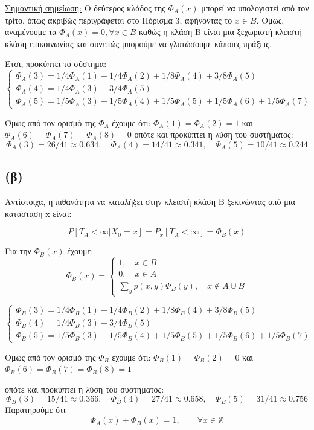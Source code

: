 \documentclass[a4paper,oneside, 11pt]{article}
\begin{document}
\underline{Σημαντική σημείωση:} Ο δεύτερος κλάδος της $\Phi_A(x)$ μπορεί να υπολογιστεί από τον τρίτο, όπως ακριβώς περιγράφεται στο Πόρισμα 3, αφήνοντας το $x \in B$. Όμως, αναμένουμε τα $\Phi_A(x) = 0, \forall x \in B$ καθώς η κλάση Β είναι μια ξεχωριστή κλειστή κλάση επικοινωνίας και συνεπώς μπορούμε να γλυτώσουμε κάποιες πράξεις. 
\bigbreak 


Έτσι, προκύπτει το σύστημα:
$$
\begin{cases}
\Phi_A(3) = 1/4 \Phi_A(1) + 1/4 \Phi_A(2) + 1/8 \Phi_A(4) + 3/8\Phi_A(5) \\
\Phi_A(4) = 1/4 \Phi_A(3) + 3/4\Phi_A(5) \\
\Phi_A(5) = 1/5\Phi_A(3) + 1/5 \Phi_A(4) + 1/5 \Phi_A(5) + 1/5\Phi_A(6) + 1/5\Phi_A(7)
\end{cases}
$$

Όμως από τον ορισμό της $\Phi_A$ έχουμε ότι: $\Phi_A(1)=\Phi_A(2) = 1$ και $\Phi_A(6)=\Phi_A(7) = \Phi_A(8) = 0$
οπότε και προκύπτει η λύση του συστήματος:
$$
\Phi_A(3) = 26/41 \approx 0.634 ,\quad \Phi_A(4)= 14/41 \approx 0.341 ,\quad \Phi_A(5) = 10/41  \approx 0.244
$$

\subsection*{(β)}
Αντίστοιχα, η πιθανότητα να καταλήξει στην κλειστή κλάση B ξεκινώντας από μια κατάσταση x είναι:

$$
P[T_A < \infty | X_0 = x] = P_x[T_A < \infty] = \Phi_Β(x)
$$

Για την $\Phi_B(x)$ έχουμε:
$$
\Phi_B(x) =  \begin{cases}
1, \quad x \in B \\
0, \quad x \in A \\
\sum_{y} p(x,y) \Phi_B(y), \quad x \not\in A \cup B
\end{cases}
$$


$$
\begin{cases}
\Phi_B(3) = 1/4 \Phi_B(1) + 1/4 \Phi_B(2) + 1/8 \Phi_B(4) + 3/8\Phi_B(5) \\
\Phi_B(4) = 1/4 \Phi_B(3) + 3/4\Phi_B(5) \\
\Phi_B(5) = 1/5\Phi_B(3) + 1/5 \Phi_B(4) + 1/5 \Phi_B(5) + 1/5\Phi_B(6) + 1/5\Phi_B(7)
\end{cases}
$$

Όμως από τον ορισμό της $\Phi_Β$ έχουμε ότι: $\Phi_Β(1)=\Phi_Β(2) = 0$ και $\Phi_Β(6)=\Phi_Β(7) = \Phi_Β(8) = 1$

οπότε και προκύπτει η λύση του συστήματος:
$$
\Phi_Β(3) = 15/41 \approx 0.366, \quad \Phi_Β(4)= 27/41  \approx 0.658 ,\quad \Phi_Β(5) = 31/41  \approx 0.756
$$
\bigbreak 
Παρατηρούμε ότι
$$
\Phi_A(x) + \Phi_B(x) = 1, \qquad \forall x \in \mathbb X
$$ 
\end{document}

